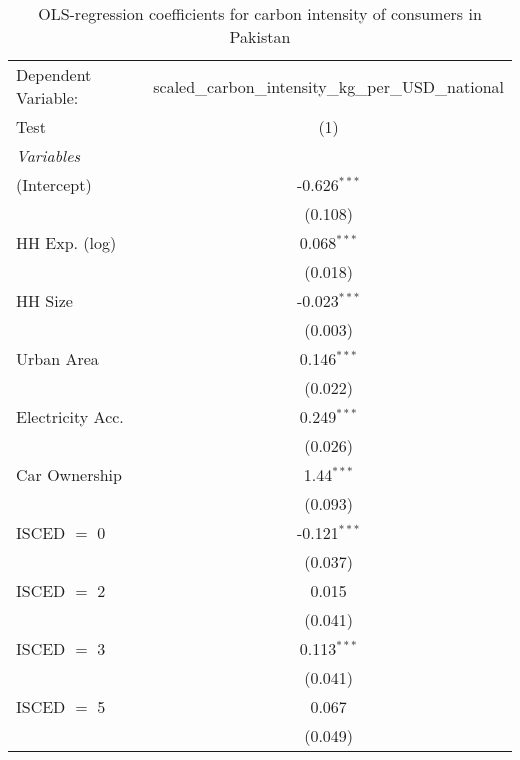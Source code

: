 
\begin{table}[htbp!]
   \centering
   \small
   \begin{adjustbox}{width = 1\textwidth, max height = 0.95\textheight, center}
      \begin{threeparttable}[b]
         \caption{\label{tab:OLS_1_PAK} OLS-regression coefficients for carbon intensity of consumers in Pakistan}
         \begin{tabular}{lc}
            \tabularnewline \midrule \midrule
            Dependent Variable: & scaled\_carbon\_intensity\_kg\_per\_USD\_national\\        
            Test                & (1)\\  
            \midrule
            \emph{Variables}\\
            (Intercept)         & -0.626$^{***}$\\   
                                & (0.108)\\   
            HH Exp. (log)       & 0.068$^{***}$\\   
                                & (0.018)\\   
            HH Size             & -0.023$^{***}$\\   
                                & (0.003)\\   
            Urban Area          & 0.146$^{***}$\\   
                                & (0.022)\\   
            Electricity Acc.    & 0.249$^{***}$\\   
                                & (0.026)\\   
            Car Ownership       & 1.44$^{***}$\\   
                                & (0.093)\\   
            ISCED $=$ 0         & -0.121$^{***}$\\   
                                & (0.037)\\   
            ISCED $=$ 2         & 0.015\\   
                                & (0.041)\\   
            ISCED $=$ 3         & 0.113$^{***}$\\   
                                & (0.041)\\   
            ISCED $=$ 5         & 0.067\\   
                                & (0.049)\\   

\end{tabular}
\end{threeparttable}
\end{adjustbox}
\end{table}
